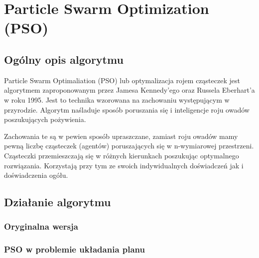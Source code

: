 
\section{Particle Swarm Optimization (PSO)}
\author{Paweł Jastrzębski}
\subsection{Ogólny opis algorytmu}
\par Particle Swarm Optimaliation (PSO) lub optymalizacja rojem cząsteczek jest algorytmem zaproponowanym przez Jamesa Kennedy'ego oraz Russela Eberhart'a w roku 1995. Jest to technika wzorowana na zachowaniu występującym w przyrodzie. Algorytm naśladuje sposób poruszania się i inteligencje roju owadów poszukujących pożywienia. 
\par Zachowania te są w pewien sposób upraszczane, zamiast roju owadów mamy pewną liczbę cząsteczek (agentów) poruszających się w n-wymiarowej przestrzeni. Cząsteczki przemieszczają się w różnych kierunkach poszukując optymalnego rozwiązania. Korzystają przy tym ze swoich indywidualnych doświadczeń jak i doświadczenia ogółu.

\subsection{Działanie algorytmu}
\subsubsection{Oryginalna wersja}
\subsubsection{PSO w problemie układania planu}
